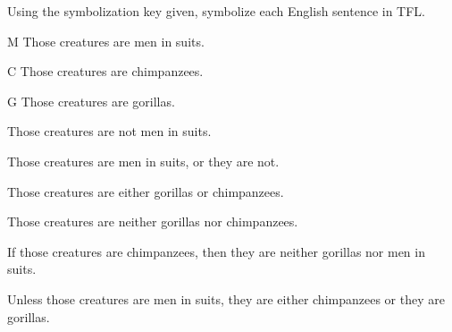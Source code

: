 \begin{practiceproblems}
\problempart Using the symbolization key given, symbolize each English sentence in TFL.\label{pr.monkeysuits}
	\begin{ekey}
		\item[M] Those creatures are men in suits.
		\item[C] Those creatures are chimpanzees.
		\item[G] Those creatures are gorillas.
	\end{ekey}
\begin{earg}
\item Those creatures are not men in suits.
\item Those creatures are men in suits, or they are not.
\item Those creatures are either gorillas or chimpanzees.
\item Those creatures are neither gorillas nor chimpanzees.
\item If those creatures are chimpanzees, then they are neither gorillas nor men in suits.
\item Unless those creatures are men in suits, they are either chimpanzees or they are gorillas.
\end{earg}


\end{practiceproblems}
